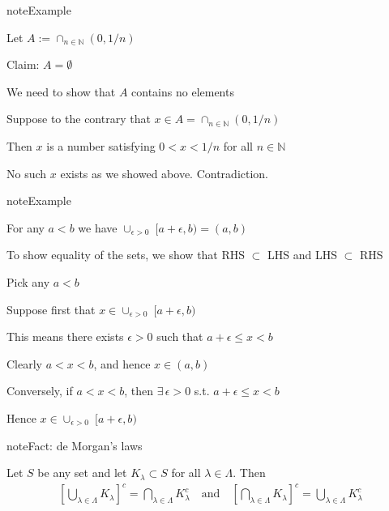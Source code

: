\documentclass[letterpaper,10pt,english]{jupyterBook}
\begin{document}
\begin{sphinxadmonition}{note}{Example}

\sphinxAtStartPar
Let \(A := \cap_{n \in \mathbb{N}} (0, 1/n)\)

\sphinxAtStartPar
Claim: \(A = \emptyset\)
\end{sphinxadmonition}

\sphinxAtStartPar
{} We need to show that \(A\) contains no elements

\sphinxAtStartPar
Suppose to the contrary that \(x \in A = \cap_{n \in \mathbb{N}} (0, 1/n)\)

\sphinxAtStartPar
Then \(x\) is a number satisfying \(0 < x < 1/n\) for all \(n \in \mathbb{N}\)

\sphinxAtStartPar
No such \(x\) exists as we showed above. Contradiction.

\begin{sphinxadmonition}{note}{Example}

\sphinxAtStartPar
For any \(a < b\) we have \(\cup_{\epsilon > 0 } \; [a + \epsilon, b) = (a, b)\)
\end{sphinxadmonition}

\sphinxAtStartPar
{} To show equality of the sets, we show that RHS \(\subset\) LHS and LHS \(\subset\) RHS

\sphinxAtStartPar
Pick any \(a < b\)

\sphinxAtStartPar
Suppose first that \(x \in \cup_{\epsilon > 0 } \; [a + \epsilon, b)\)

\sphinxAtStartPar
This means there exists \(\epsilon > 0\) such that \(a + \epsilon \leq x < b\)

\sphinxAtStartPar
Clearly \(a < x < b\), and hence \(x \in (a, b)\)

\sphinxAtStartPar
Conversely, if \(a < x < b\), then \(\exists \, \epsilon > 0\) s.t. \(a +
\epsilon \leq x < b\)

\sphinxAtStartPar
Hence \(x \in \cup_{\epsilon > 0 } \; [a + \epsilon, b)\)

\begin{sphinxadmonition}{note}{Fact: de Morgan’s laws}

\sphinxAtStartPar
Let \(S\) be any set and let \(K_{\lambda} \subset S\) for all \(\lambda \in \Lambda\). Then
\begin{equation*}
\begin{split}
\left[ \bigcup_{\lambda \in \Lambda} K_{\lambda}  \right]^{c}  =
\bigcap_{\lambda \in \Lambda} K_{\lambda}^{c}
\quad \text{and} \quad
\left[ \bigcap_{\lambda \in \Lambda}
K_{\lambda}  \right]^{c}  = \bigcup_{\lambda \in \Lambda} K_{\lambda}^{c}
\end{split}
\end{equation*}\end{sphinxadmonition}
\end{document}

